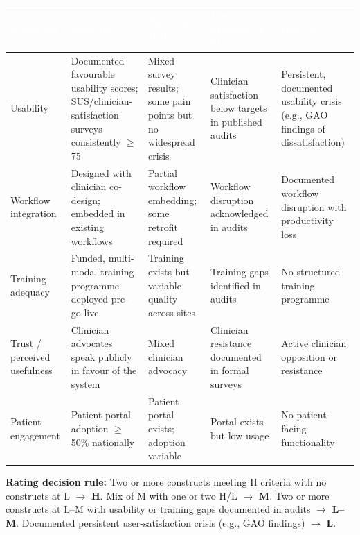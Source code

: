 \begin{table}[H]
\footnotesize
\begin{tabular}{p{2.5cm} p{3.1cm} p{3.1cm} p{3.1cm} p{3.1cm}}
\toprule
\rowcolor{headerblue}
\textcolor{white}{\textbf{Construct}} &
\textcolor{white}{\textbf{High (H)}} &
\textcolor{white}{\textbf{Medium (M)}} &
\textcolor{white}{\textbf{Low--Medium (L--M)}} &
\textcolor{white}{\textbf{Low (L)}} \\
\midrule

\rowcolor{rowgray}
Usability &
Documented favourable usability scores; SUS/clinician-satisfaction surveys consistently $\geq$75 &
Mixed survey results; some pain points but no widespread crisis &
Clinician satisfaction below targets in published audits &
Persistent, documented usability crisis (e.g., GAO findings of dissatisfaction) \\

Workflow integration &
Designed with clinician co-design; embedded in existing workflows &
Partial workflow embedding; some retrofit required &
Workflow disruption acknowledged in audits &
Documented workflow disruption with productivity loss \\

\rowcolor{rowgray}
Training adequacy &
Funded, multi-modal training programme deployed pre-go-live &
Training exists but variable quality across sites &
Training gaps identified in audits &
No structured training programme \\

Trust / perceived usefulness &
Clinician advocates speak publicly in favour of the system &
Mixed clinician advocacy &
Clinician resistance documented in formal surveys &
Active clinician opposition or resistance \\

\rowcolor{rowgray}
Patient engagement &
Patient portal adoption $\geq$50\% nationally &
Patient portal exists; adoption variable &
Portal exists but low usage &
No patient-facing functionality \\

\bottomrule
\end{tabular}
\end{table}

\noindent\textbf{Rating decision rule:}
Two or more constructs meeting H criteria with no constructs at L $\rightarrow$ \textbf{H}.
Mix of M with one or two H/L $\rightarrow$ \textbf{M}.
Two or more constructs at L--M with usability or training gaps documented in audits $\rightarrow$ \textbf{L--M}.
Documented persistent user-satisfaction crisis (e.g., GAO findings) $\rightarrow$ \textbf{L}.

